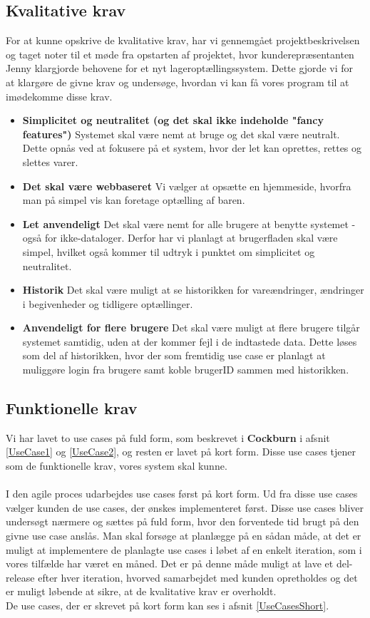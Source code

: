 \documentclass[]{article}
\begin{document}
\subsection{Kvalitative krav}
For at kunne opskrive de kvalitative krav, har vi gennemgået projektbeskrivelsen og taget noter til et møde fra opstarten af projektet, hvor kunderepræsentanten Jenny klargjorde behovene for et nyt lageroptællingssystem. Dette gjorde vi for at klargøre de givne krav og undersøge, hvordan vi kan få vores program til at imødekomme disse krav.
\begin{itemize}
 	\item \textbf{Simplicitet og neutralitet (og det skal ikke indeholde "fancy features")} Systemet skal være nemt at bruge og det skal være neutralt. Dette opnås ved at fokusere på et system, hvor der let kan oprettes, rettes og slettes varer.
 	\item \textbf{Det skal være webbaseret} Vi vælger at opsætte en hjemmeside, hvorfra man på simpel vis kan foretage optælling af baren.
 	\item \textbf{Let anvendeligt} Det skal være nemt for alle brugere at benytte systemet - også for ikke-dataloger. Derfor har vi planlagt at brugerfladen skal være simpel, hvilket også kommer til udtryk i punktet om simplicitet og neutralitet.
 	\item \textbf{Historik} Det skal være muligt at se historikken for vareændringer, ændringer i begivenheder og tidligere optællinger.
 	\item \textbf{Anvendeligt for flere brugere} Det skal være muligt at flere brugere tilgår systemet samtidig, uden at der kommer fejl i de indtastede data. Dette løses som del af historikken, hvor der som fremtidig use case er planlagt at muliggøre login fra brugere samt koble brugerID sammen med historikken.
\end{itemize}

\subsection{Funktionelle krav}
Vi har lavet to use cases på fuld form, som beskrevet i \textbf{Cockburn} i afsnit \ref{UseCase1} og \ref{UseCase2}, og resten er lavet på kort form. Disse use cases tjener som de funktionelle krav, vores system skal kunne. \\ \\
I den agile proces udarbejdes use cases først på kort form. Ud fra disse use cases vælger kunden de use cases, der ønskes implementeret først. Disse use cases bliver undersøgt nærmere og sættes på fuld form, hvor den forventede tid brugt på den givne use case anslås. Man skal forsøge at planlægge på en sådan måde, at det er muligt at implementere de planlagte use cases i løbet af en enkelt iteration, som i vores tilfælde har været en måned. Det er på denne måde muligt at lave et del-release efter hver iteration, hvorved samarbejdet med kunden opretholdes og det er muligt løbende at sikre, at de kvalitative krav er overholdt. \\
De use cases, der er skrevet på kort form kan ses i afsnit \ref{UseCasesShort}.
\end{document}
